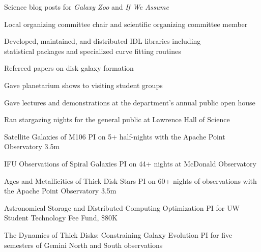 \documentclass[10pt]{cv}
\begin{document}
\begin{llist}
Science blog posts for {\it Galaxy Zoo} and {\it If We Assume}

Local organizing committee chair and scientific organizing committee 
member %

Developed, maintained, and distributed IDL libraries including \\
statistical packages and specialized curve fitting routines

Refereed papers on disk galaxy formation

Gave planetarium shows to visiting student groups 

Gave lectures and demonstrations at the department's annual public open house

Ran stargazing nights for the general public at Lawrence Hall of Science


{\sc Satellite Galaxies of M106}
PI on 5+ half-nights with the Apache Point Observatory 3.5m

{\sc IFU Observations of Spiral Galaxies}
PI on 44+ nights at McDonald Observatory

{\sc Ages and Metallicities of Thick Disk Stars}
PI on 60+ nights of observations with the Apache Point Observatory 3.5m

{\sc Astronomical Storage and Distributed Computing Optimization}
PI for UW Student Technology Fee Fund, \$80K

{\sc The Dynamics of Thick Disks: Constraining Galaxy Evolution}
PI for five semesters of Gemini North and South observations





\end{llist}
\end{document}
